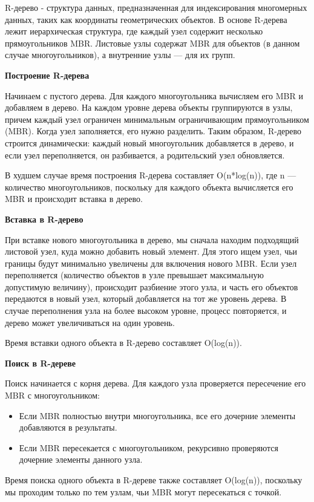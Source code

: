 \documentclass[12pt]{article}
\begin{document}
\bigbreak

R-дерево - структура данных, предназначенная для индексирования многомерных данных, таких как координаты геометрических объектов. В основе R-дерева лежит иерархическая структура, где каждый узел содержит несколько прямоугольников MBR. Листовые узлы содержат MBR для объектов (в данном случае многоугольников), а внутренние узлы — для их групп.

\textbf{Построение R-дерева}

Начинаем с пустого дерева. Для каждого многоугольника вычисляем его MBR и добавляем в дерево. На каждом уровне дерева объекты группируются в узлы, причем каждый узел ограничен минимальным ограничивающим прямоугольником (MBR). Когда узел заполняется, его нужно разделить. Таким образом, R-дерево строится динамически: каждый новый многоугольник добавляется в дерево, и если узел переполняется, он разбивается, а родительский узел обновляется.

В худшем случае время построения R-дерева составляет O(n*log(n)), где n — количество многоугольников, поскольку для каждого объекта вычисляется его MBR и происходит вставка в дерево.

\textbf{Вставка в R-дерево}

При вставке нового многоугольника в дерево, мы сначала находим подходящий листовой узел, куда можно добавить новый элемент. Для этого ищем узел, чьи границы будут минимально увеличены для включения нового MBR. Если узел переполняется (количество объектов в узле превышает максимальную допустимую величину), происходит разбиение этого узла, и часть его объектов передаются в новый узел, который добавляется на тот же уровень дерева. В случае переполнения узла на более высоком уровне, процесс повторяется, и дерево может увеличиваться на один уровень.

Время вставки одного объекта в R-дерево составляет O(log(n)).

\textbf{Поиск в R-дереве}

Поиск начинается с корня дерева. Для каждого узла проверяется пересечение его MBR с многоугольником:
\begin{itemize}
    \item Если MBR полностью внутри многоугольника, все его дочерние элементы добавляются в результаты.
    \item Если MBR пересекается с многоугольником, рекурсивно проверяются дочерние элементы данного узла.
\end{itemize}
Время поиска одного объекта в R-дереве также составляет O(log(n)), поскольку мы проходим только по тем узлам, чьи MBR могут пересекаться с точкой.
\end{document}
